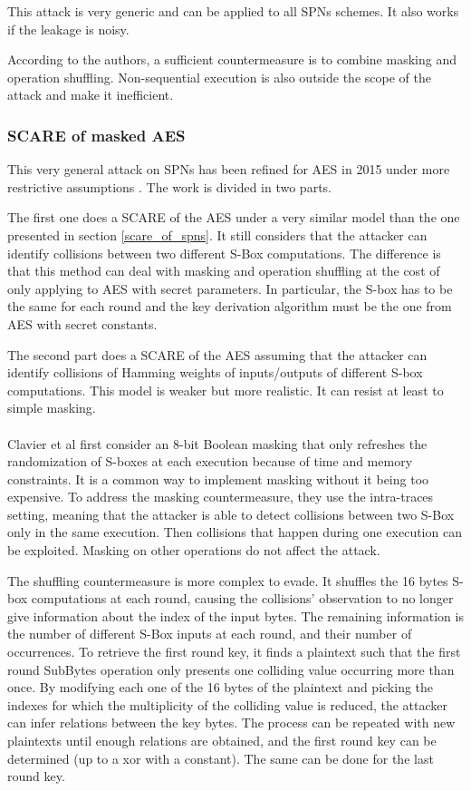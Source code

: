\documentclass[11pt]{sdm}
\begin{document}
This attack is very generic and can be applied to all SPNs schemes.
It also works if the leakage is noisy.

According to the authors, a sufficient countermeasure is to combine masking and operation shuffling.
Non-sequential execution is also outside the scope of the attack and make it inefficient.


\subsubsection{SCARE of masked AES}

This very general attack on SPNs has been refined for AES in 2015 under more restrictive assumptions \parencite{Clavier_Isorez_Marion_Wurcker_2015}.
The work is divided in two parts.

The first one does a SCARE of the AES under a very similar model than the one presented in section \ref{scare_of_spns}.
It still considers that the attacker can identify collisions between two different S-Box computations.
The difference is that this method can deal with masking and operation shuffling at the cost of only applying to AES with secret parameters.
In particular, the S-box has to be the same for each round and the key derivation algorithm must be the one from AES with secret constants.

The second part does a SCARE of the AES assuming that the attacker can identify collisions of Hamming weights of inputs/outputs of different S-box computations.
This model is weaker but more realistic.
It can resist at least to simple masking.

\paragraph{}
Clavier et al first consider an 8-bit Boolean masking that only refreshes the randomization of S-boxes at each execution because of time and memory constraints.
It is a common way to implement masking without it being too expensive.
To address the masking countermeasure, they use the intra-traces setting, meaning that the attacker is able to detect collisions between two S-Box only in the same execution.
Then collisions that happen during one execution can be exploited.
Masking on other operations do not affect the attack.

The shuffling countermeasure is more complex to evade.
It shuffles the 16 bytes S-box computations at each round, causing the collisions' observation to no longer give information about the index of the input bytes.
The remaining information is the number of different S-Box inputs at each round, and their number of occurrences.
To retrieve the first round key, it finds a plaintext such that the first round SubBytes operation only presents one colliding value occurring more than once.
By modifying each one of the 16 bytes of the plaintext and picking the indexes for which the multiplicity of the colliding value is reduced, the attacker can infer relations between the key bytes.
The process can be repeated with new plaintexts until enough relations are obtained, and the first round key can be determined (up to a xor with a constant).
The same can be done for the last round key.
\end{document}
